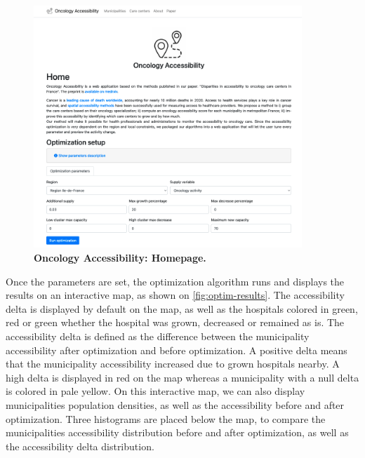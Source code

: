\begin{figure}[h!]
    \includegraphics[width=0.9\textwidth]{images/oncology-accessibility/home.png}
    \centering
    \caption{
        \textbf{Oncology Accessibility: Homepage.}
    }
    \label{fig:optim-form}
\end{figure}

Once the parameters are set, the optimization algorithm runs and displays the
results on an interactive map, as shown on \cref{fig:optim-results}. The
accessibility delta is displayed by default on the map, as well as the hospitals
colored in green, red or green whether the hospital was grown, decreased or
remained as is. The accessibility delta is defined as the difference between the
municipality accessibility after optimization and before optimization. A
positive delta means that the municipality accessibility increased due to grown
hospitals nearby. A high delta is displayed in red on the map whereas a
municipality with a null delta is colored in pale yellow. On this interactive
map, we can also display municipalities population densities, as well as the
accessibility before and after optimization. Three histograms are placed below
the map, to compare the municipalities accessibility distribution before and
after optimization, as well as the accessibility delta distribution.

